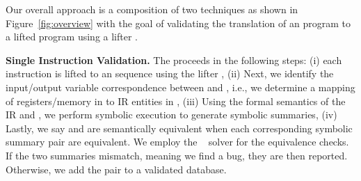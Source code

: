 


Our overall approach is a composition of two techniques as shown
in Figure~\ref{fig:overview} with the goal of validating the 
translation of an \ISA program  to a lifted \LLVM program  using a 
lifter .

\textbf{Single Instruction Validation.} The \siv proceeds in the following
steps: (i) each \ISA instruction  is lifted to an \LLVM sequence 
using the lifter , (ii) Next, we identify the input/output variable
correspondence between  and , i.e., we determine a mapping of
registers/memory in  to IR entities in ,  (iii) Using the formal
semantics of the IR and \ISA, we perform symbolic execution to generate
symbolic summaries, (iv) Lastly, we say  and  are semantically
equivalent when each corresponding symbolic summary pair are equivalent. We
employ the \Z~\cite{z3:2008} solver for the equivalence checks. If the two
summaries mismatch, meaning we find a bug, they are then reported.  Otherwise,
we add the pair  to a validated database.

